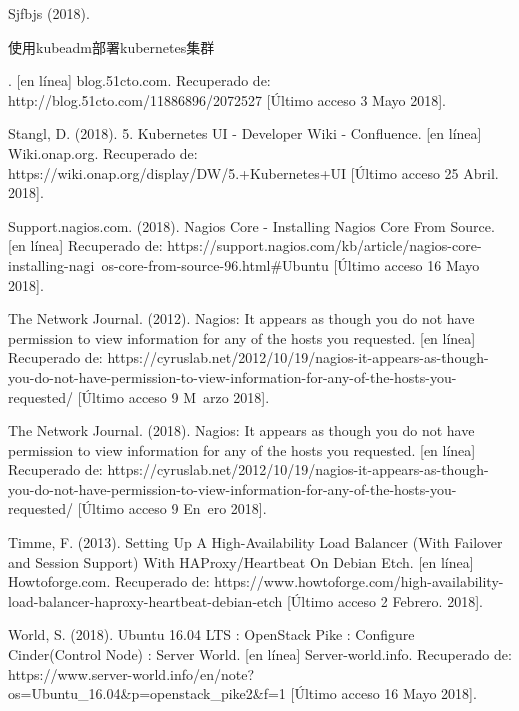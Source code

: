 Sjfbjs (2018). \begin{CJK*}{UTF8}{gbsn}使用kubeadm部署kubernetes集群\end{CJK*}. [en línea] blog.51cto.com. Recuperado de: http://blog.51cto.com/11886896/2072527 [Último acceso 3 Mayo 2018].

Stangl, D. (2018). 5. Kubernetes UI - Developer Wiki - Confluence. [en línea] Wiki.onap.org. Recuperado de: https://wiki.onap.org/display/DW/5.+Kubernetes+UI [Último acceso 25 Abril. 2018].


Support.nagios.com. (2018). Nagios Core - Installing Nagios Core From Source. [en línea] Recuperado de: https://support.nagios.com/kb/article/nagios-core-installing-nagi\ os-core-from-source-96.html\#Ubuntu [Último acceso 16 Mayo 2018].

The Network Journal. (2012). Nagios: It appears as though you do not have permission to view information for any of the hosts you requested. [en línea] Recuperado de: https://cyruslab.net/2012/10/19/nagios-it-appears-as-though-you-do-not-have-permission-to-view-information-for-any-of-the-hosts-you-requested/ [Último acceso 9 M\ arzo 2018].

The Network Journal. (2018). Nagios: It appears as though you do not have permission to view information for any of the hosts you requested. [en línea] Recuperado de: https://cyruslab.net/2012/10/19/nagios-it-appears-as-though-you-do-not-have-permission-to-view-information-for-any-of-the-hosts-you-requested/ [Último acceso 9 En\ ero 2018].

Timme, F. (2013). Setting Up A High-Availability Load Balancer (With Failover and Session Support) With HAProxy/Heartbeat On Debian Etch. [en línea] Howtoforge.com. Recuperado de: https://www.howtoforge.com/high-availability-load-balancer-haproxy-heartbeat-debian-etch [Último acceso 2 Febrero. 2018].

World, S. (2018). Ubuntu 16.04 LTS : OpenStack Pike : Configure Cinder(Control Node) : Server World. [en línea] Server-world.info. Recuperado de: https://www.server-world.info/en/note?os=Ubuntu\_16.04\&p=openstack\_pike2\&f=1 [Último acceso 16 Mayo 2018].











    
    

